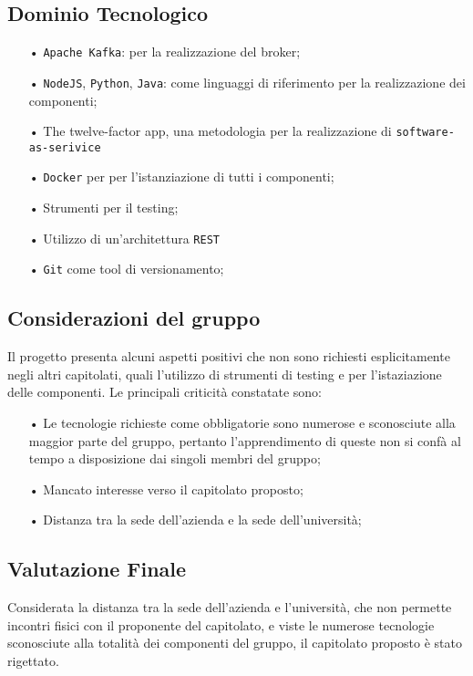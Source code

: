 \subsection{Dominio Tecnologico}
\begin{itemize}
\item[•] \texttt{Apache Kafka}: per la realizzazione del broker;
\item[•] \texttt{NodeJS}, \texttt{Python}, \texttt{Java}: come linguaggi di riferimento per la realizzazione dei componenti;
\item[•] The twelve-factor app, una metodologia per la realizzazione di \texttt{software-as-serivice}
\item[•] \texttt{Docker} per per l’istanziazione di
tutti i componenti;
\item[•] Strumenti per il testing;
\item[•] Utilizzo di un'architettura \texttt{REST}
\item[•] \texttt{Git} come tool di versionamento; 
\end{itemize}
\subsection{Considerazioni del gruppo}

Il progetto presenta alcuni aspetti positivi che non sono richiesti esplicitamente negli altri capitolati, quali l'utilizzo di strumenti di testing e per l'istaziazione delle componenti. 
Le principali criticità constatate sono:
\begin{itemize}
\item[•] Le tecnologie richieste come obbligatorie sono numerose e sconosciute alla maggior parte del gruppo, pertanto l'apprendimento di queste non si confà al tempo a disposizione dai singoli membri del gruppo; 
\item[•] Mancato interesse verso il capitolato proposto;
\item[•] Distanza tra la sede dell'azienda e la sede dell'università;
\end{itemize}

\subsection{Valutazione Finale}
Considerata la distanza tra la sede dell'azienda e l'università, che non permette incontri fisici con il proponente del capitolato, e viste le numerose tecnologie sconosciute alla totalità dei componenti del gruppo, il capitolato proposto è stato rigettato.

